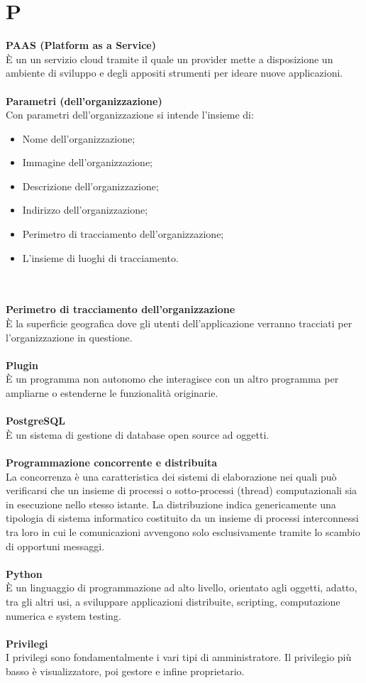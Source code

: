 \section{P}
\textbf{PAAS (Platform as a Service)}\\
È un un servizio cloud tramite il quale un provider mette a disposizione un ambiente di sviluppo e degli appositi strumenti per ideare nuove applicazioni. \\ \\
\textbf{Parametri (dell'organizzazione)}\\
Con parametri dell'organizzazione si intende l'insieme di:
\begin{itemize}
    \item Nome dell'organizzazione;
    \item Immagine dell'organizzazione;
    \item Descrizione dell'organizzazione;
    \item Indirizzo dell'organizzazione;
    \item Perimetro di tracciamento dell'organizzazione;
    \item L'insieme di luoghi di tracciamento.
\end{itemize} \mbox{} \\ \\

\textbf{Perimetro di tracciamento dell'organizzazione}\\
È la superficie geografica dove gli utenti dell'applicazione verranno tracciati per l'organizzazione in questione.\\ \\
\textbf{Plugin}\\
È un programma non autonomo che interagisce con un altro programma per ampliarne o estenderne le funzionalità originarie. \\ \\
\textbf{PostgreSQL}\\
È un sistema di gestione di database open source ad oggetti. \\ \\
\textbf{Programmazione concorrente e distribuita}\\
La concorrenza è una caratteristica dei sistemi di elaborazione nei quali può verificarsi che un insieme di processi o sotto-processi (thread) computazionali sia in esecuzione nello stesso istante. La distribuzione indica genericamente una tipologia di sistema informatico costituito da un insieme di processi interconnessi tra loro in cui le comunicazioni avvengono solo esclusivamente tramite lo scambio di opportuni messaggi. \\ \\
\textbf{Python}\\
È un linguaggio di programmazione ad alto livello, orientato agli oggetti, adatto, tra gli altri usi, a sviluppare applicazioni distribuite, scripting, computazione numerica e system testing. \\ \\
\textbf{Privilegi}\\
I privilegi sono fondamentalmente i vari tipi di amministratore. Il privilegio più basso è visualizzatore, poi gestore e infine proprietario. \\ \\
\clearpage
